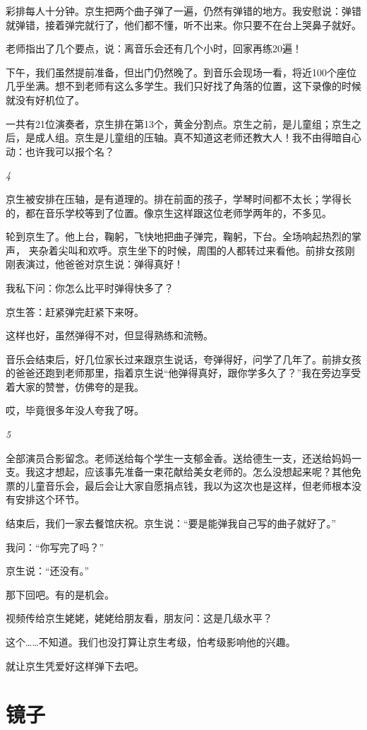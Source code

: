\documentclass[twoside,openright,headings=optiontohead]{ctexbook} %
\begin{document}
{彩排每人十分钟。京生把两个曲子弹了一遍，仍然有弹错的地方。我安慰说：弹错就弹错，接着弹完就行了，他们都不懂，听不出来。你只要不在台上哭鼻子就好。

老师指出了几个要点，说：离音乐会还有几个小时，回家再练20遍！

下午，我们虽然提前准备，但出门仍然晚了。到音乐会现场一看，将近100个座位几乎坐满。想不到老师有这么多学生。我们只好找了角落的位置，这下录像的时候就没有好机位了。

一共有21位演奏者，京生排在第13个，黄金分割点。京生之前，是儿童组；京生之后，是成人组。京生是儿童组的压轴。真不知道这老师还教大人！我不由得暗自心动：也许我可以报个名？

\emph{4}

京生被安排在压轴，是有道理的。排在前面的孩子，学琴时间都不太长；学得长的，都在音乐学校等到了位置。像京生这样跟这位老师学两年的，不多见。

轮到京生了。他上台，鞠躬，飞快地把曲子弹完，鞠躬，下台。全场响起热烈的掌声，
夹杂着尖叫和欢呼。京生坐下的时候，周围的人都转过来看他。前排女孩刚刚表演过，他爸爸对京生说：弹得真好！

我私下问：你怎么比平时弹得快多了？

京生答：赶紧弹完赶紧下来呀。

这样也好，虽然弹得不对，但显得熟练和流畅。

音乐会结束后，好几位家长过来跟京生说话，夸弹得好，问学了几年了。前排女孩的爸爸还跑到老师那里，指着京生说``他弹得真好，跟你学多久了？''我在旁边享受着大家的赞誉，仿佛夸的是我。

哎，毕竟很多年没人夸我了呀。

\emph{5}

全部演员合影留念。老师送给每个学生一支郁金香。送给德生一支，还送给妈妈一支。我这才想起，应该事先准备一束花献给美女老师的。怎么没想起来呢？其他免票的儿童音乐会，最后会让大家自愿捐点钱，我以为这次也是这样，但老师根本没有安排这个环节。

结束后，我们一家去餐馆庆祝。京生说：``要是能弹我自己写的曲子就好了。''

我问：``你写完了吗？''

京生说：``还没有。''

那下回吧。有的是机会。

视频传给京生姥姥，姥姥给朋友看，朋友问：这是几级水平？

这个\ldots{}\ldots{}不知道。我们也没打算让京生考级，怕考级影响他的兴趣。

就让京生凭爱好这样弹下去吧。

\chapter*{镜子}\label{mirror}

}
\end{document}
